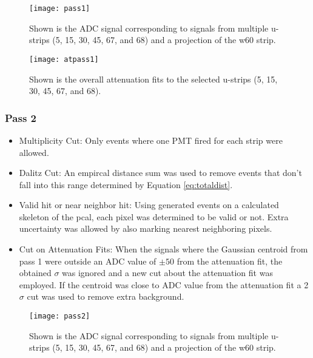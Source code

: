 \begin{figure}[h]
    \centering
    \texttt{[image: pass1]}
    \caption{Shown is the ADC signal corresponding to signals from multiple u-strips
     (5, 15, 30, 45, 67, and 68) and a projection of the w60 strip.}
    \label{fig:pass1}
\end{figure}

\begin{figure}[h]
    \centering
    \texttt{[image: atpass1]}
    \caption{Shown is the overall attenuation fits to the selected u-strips 
    (5, 15, 30, 45, 67, and 68).}
    \label{fig:atpass1}
\end{figure}



\clearpage
\FloatBarrier
\subsubsection{Pass 2}
\begin{itemize}
    \item Multiplicity Cut: Only events where one PMT fired for each strip were allowed.
    \item Dalitz Cut: An empircal distance sum was used to remove events that don't fall 
    into this range determined by Equation \ref{eq:totaldist}.
    \item Valid hit or near neighbor hit: Using generated events on a calculated skeleton 
    of the pcal, each pixel was determined to be valid or not. Extra uncertainty was allowed 
    by also marking nearest neighboring pixels.
    \item Cut on Attenuation Fits: When the signals where the Gaussian centroid from pass 1 
    were outside an ADC value of $\pm50$ from the attenuation fit, the obtained $\sigma$ was 
    ignored and a new cut about the attenuation fit was employed. If the centroid was close 
    to ADC value from the attenuation fit a 2$\sigma$ cut was used to remove extra background.
\end{itemize}


\begin{figure}[h]
    \centering
    \texttt{[image: pass2]}
    \caption{Shown is the ADC signal corresponding to signals from multiple u-strips 
    (5, 15, 30, 45, 67, and 68) and a projection of the w60 strip.}
    \label{fig:pass2}
\end{figure}

